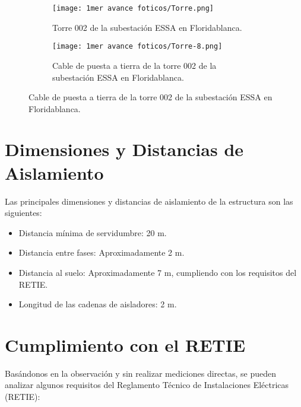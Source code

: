 \begin{figure}[h!] %
    \centering %
    \begin{subfigure}{0.5\textwidth}
        \texttt{[image: 1mer avance foticos/Torre.png]}
        \caption{Torre 002 de la subestación ESSA en Floridablanca.} %
        \label{fig:Torre} %
    \end{subfigure}
    \hfill %
    \begin{subfigure}{0.5\textwidth}
        \centering %
        \texttt{[image: 1mer avance foticos/Torre-8.png]}
        \caption{Cable de puesta a tierra de la torre 002 de la subestación ESSA en Floridablanca.} %
        \label{fig:Torre-8} %
    \end{subfigure}
\end{figure}


\section{Dimensiones y Distancias de Aislamiento}

Las principales dimensiones y distancias de aislamiento de la estructura son las siguientes:

\begin{itemize}
    \item Distancia mínima de servidumbre: 20 m.
    \item Distancia entre fases: Aproximadamente 2 m.
    \item Distancia al suelo: Aproximadamente 7 m, cumpliendo con los requisitos del RETIE.
    \item Longitud de las cadenas de aisladores: 2 m.
\end{itemize}

\section{Cumplimiento con el RETIE}

Basándonos en la observación y sin realizar mediciones directas, se pueden analizar algunos requisitos del Reglamento Técnico de Instalaciones Eléctricas (RETIE):

